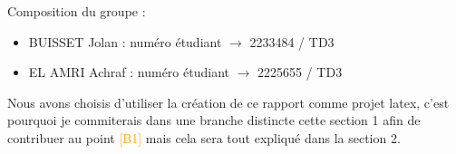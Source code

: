 Composition du groupe :
\begin{itemize}
    \item BUISSET Jolan : numéro étudiant $\rightarrow$ 2233484 / TD3
    \item EL AMRI Achraf : numéro étudiant $\rightarrow$ 2225655 / TD3
\end{itemize}
Nous avons choisis d'utiliser la création de ce rapport comme projet latex, c'est pourquoi je commiterais dans une branche distincte cette section 1 afin de contribuer au point \textcolor{orange}{[B1]} mais cela sera tout expliqué dans la section 2.
